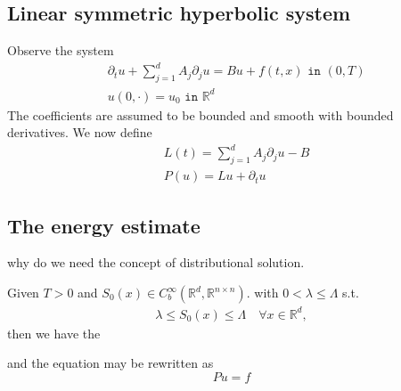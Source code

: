 \subsection{Linear symmetric hyperbolic system}
Observe the system
\begin{align*}
	& \partial_t u + \sum_{j = 1}^d A_j \partial_j u = Bu + f(t, x) \texttt{ in } (0, T)\\
	& u(0, \cdot) = u_0 \texttt{ in } \mathbb{R}^d
\end{align*}
The coefficients are assumed to be bounded and smooth with bounded derivatives. We now define 
\begin{align*}
	& L(t) = \sum_{j = 1}^d A_j \partial_j u - B\\
	& P(u) = Lu + \partial_t u
\end{align*}

\begin{definition}
\end{definition}

\begin{definition}
\end{definition}



\subsection{The energy estimate}
\begin{definition}
\end{definition}
why do we need the concept of distributional solution. 

\begin{proposition}
	Given $T > 0$ and $S_0(x) \in C_b^\infty(\mathbb{R}^d, \mathbb{R}^{n \times n})$. with $0 < \lambda \le \Lambda$ s.t. 
	\begin{align*}
		\lambda \le S_0(x) \le \Lambda \quad \forall x \in \mathbb{R}^d,
	\end{align*}
	then we have the  
\end{proposition}
and the equation may be rewritten as 
\begin{equation}
	Pu = f
\end{equation}

\begin{proposition}
\end{proposition}







